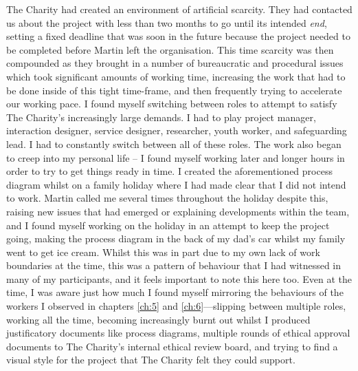 The Charity had created an environment of artificial scarcity. They had contacted us about the project with less than two months to go until its intended \textit{end}, setting a fixed deadline that was soon in the future because the project needed to be completed before Martin left the organisation. This time scarcity was then compounded as they brought in a number of bureaucratic and procedural issues which took significant amounts of working time, increasing the work that had to be done inside of this tight time-frame, and then frequently trying to accelerate our working pace.  I found myself switching between roles to attempt to satisfy The Charity’s increasingly large demands. I had to play project manager, interaction designer, service designer, researcher, youth worker, and safeguarding lead. I had to constantly switch between all of these roles. The work also began to creep into my personal life – I found myself working later and longer hours in order to try to get things ready in time. I created the aforementioned process diagram whilst on a family holiday where I had made clear that I did not intend to work. Martin called me several times throughout the holiday despite this, raising new issues that had emerged or explaining developments within the team, and I found myself working on the holiday in an attempt to keep the project going, making the process diagram in the back of my dad's car whilst my family went to get ice cream. Whilst this was in part due to my own lack of work boundaries at the time, this was a pattern of behaviour that I had witnessed in many of my participants, and it feels important to note this here too. Even at the time, I was aware just how much I found myself mirroring the behaviours of the workers I observed in chapters \ref{ch:5} and \ref{ch:6}—slipping between multiple roles, working all the time, becoming increasingly burnt out whilst I produced justificatory documents like process diagrams, multiple rounds of ethical approval documents to The Charity's internal ethical review board, and trying to find a visual style for the project that The Charity felt they could support. 

